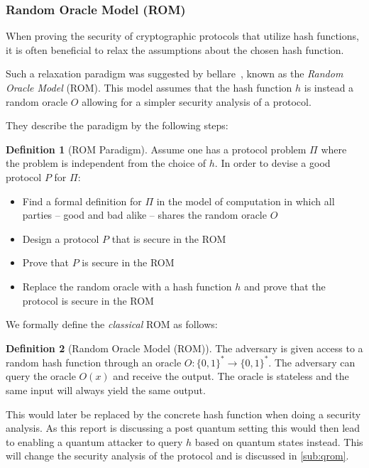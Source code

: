 \documentclass[11pt]{report}
\theoremstyle{definition}
\newtheorem{definition}{Definition}[section]
\theoremstyle{plain}
\begin{document}
\subsubsection{Random Oracle Model (ROM)}

When proving the security of cryptographic protocols that utilize hash functions, it is often beneficial to relax the assumptions about the chosen hash function.

Such a relaxation paradigm was suggested by bellare~\cite{bellare1993random}, known as the \textit{Random Oracle Model} (ROM). This model assumes that the hash function $h$ is instead a random oracle $O$ allowing for a simpler security analysis of a protocol.

They describe the paradigm by the following steps:
\begin{definition}[ROM Paradigm]
  Assume one has a protocol problem $\Pi$ where the problem is independent from the choice of $h$. In order to devise a good protocol $P$ for $\Pi$:
  \begin{itemize}
    \item Find a formal definition for $\Pi$ in the model of computation in which all parties -- good and bad alike -- shares the random oracle $O$
    \item Design a protocol $P$ that is secure in the ROM
    \item Prove that $P$ is secure in the ROM
    \item Replace the random oracle with a hash function $h$ and prove that the protocol is secure in the ROM
  \end{itemize}
\end{definition}

We formally define the \textit{classical} ROM as follows:
\begin{definition}[Random Oracle Model (ROM)]
  The adversary is given access to a random hash function through an oracle $O: \{0,1\}^* \rightarrow \{0,1\}^*$. The adversary can query the oracle $O(x)$ and receive the output. The oracle is stateless and the same input will always yield the same output.
\end{definition}

This would later be replaced by the concrete hash function when doing a security analysis. As this report is discussing a post quantum setting this would then lead to enabling a quantum attacker to query $h$ based on quantum states instead. This will change the security analysis of the protocol and is discussed in \autoref{sub:qrom}.
\end{document}

